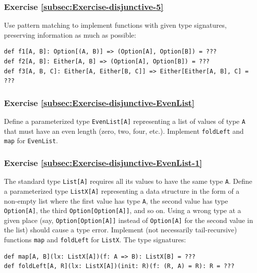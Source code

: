\subsubsection{Exercise \label{subsec:Exercise-disjunctive-5}\ref{subsec:Exercise-disjunctive-5}}

Use pattern matching to implement functions with given type signatures,
preserving information as much as possible: 
\begin{lstlisting}
def f1[A, B]: Option[(A, B)] => (Option[A], Option[B]) = ???
def f2[A, B]: Either[A, B] => (Option[A], Option[B]) = ???
def f3[A, B, C]: Either[A, Either[B, C]] => Either[Either[A, B], C] = ???
\end{lstlisting}


\subsubsection{Exercise \label{subsec:Exercise-disjunctive-EvenList}\ref{subsec:Exercise-disjunctive-EvenList}}

Define a parameterized type \lstinline!EvenList[A]! representing
a list of values of type \lstinline!A! that must have an even length
(zero, two, four, etc.). Implement \lstinline!foldLeft! and \lstinline!map!
for \lstinline!EvenList!.

\subsubsection{Exercise \label{subsec:Exercise-disjunctive-EvenList-1}\ref{subsec:Exercise-disjunctive-EvenList-1}}

The standard type \lstinline!List[A]! requires all its values to
have the same type \lstinline!A!. Define a parameterized type \lstinline!ListX[A]!
representing a data structure in the form of a non-empty list where
the first value has type \lstinline!A!, the second value has type
\lstinline!Option[A]!, the third \textemdash{} \lstinline!Option[Option[A]]!,
and so on. Using a wrong type at a given place (say, \lstinline!Option[Option[A]]!
instead of \lstinline!Option[A]! for the second value in the list)
should cause a type error. Implement (not necessarily tail-recursive)
functions \lstinline!map! and \lstinline!foldLeft! for \lstinline!ListX!.
The type signatures:
\begin{lstlisting}
def map[A, B](lx: ListX[A])(f: A => B): ListX[B] = ???
def foldLeft[A, R](lx: ListX[A])(init: R)(f: (R, A) = R): R = ???
\end{lstlisting}


